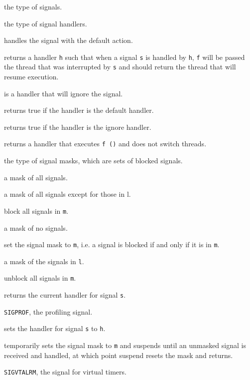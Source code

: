 \begin{description}

 the type of signals.

the type of signal handlers.

handles the signal with the default action.

returns a handler {\tt h} such that when a signal {\tt s} is handled
by {\tt h}, {\tt f} will be passed the thread that was interrupted by
{\tt s} and should return the thread that will resume execution.

is a handler that will ignore the signal.

returns true if the handler is the default handler.

returns true if the handler is the ignore handler.

returns a handler that executes {\tt f ()} and does not switch
threads.

the type of signal masks, which are sets of blocked signals.

a mask of all signals.

a mask of all signals except for those in l.

block all signals in {\tt m}.

a mask of no signals.

set the signal mask to {\tt m}, i.e. a signal is blocked if and only
if it is in {\tt m}.

 a mask of the signals in {\tt l}.

 unblock all signals in {\tt m}.

returns the current handler for signal {\tt s}.

{\tt SIGPROF}, the profiling signal.

sets the handler for signal {\tt s} to {\tt h}.

temporarily sets the signal mask to {\tt m} and suspends until an
unmasked signal is received and handled, at which point suspend resets
the mask and returns.

{\tt SIGVTALRM}, the signal for virtual timers.
\end{description}
%
